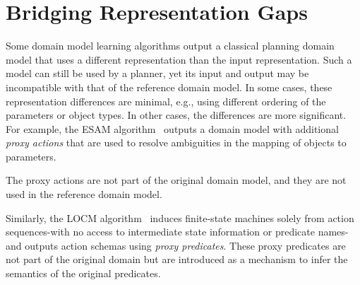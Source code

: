 \documentclass{article}
\theoremstyle{definition}
\theoremstyle{remark}
\newif\ifaddcomments
\newcommand{\roni}[1]{\ifaddcomments{\textcolor{red}{[Roni: #1]}}\fi}
\newcommand{\mauro}[1]{\ifaddcomments{\textcolor{green}{[Mauro: #1]}}\fi}
\newcommand{\yarin}[1]{\ifaddcomments{\textcolor{teal}{[Yarin: #1]}}\fi}
\begin{document}





\section{Bridging Representation Gaps}
\label{sec:bridging-gap}
Some domain model learning algorithms output a classical planning domain model that uses a different representation than the input representation. Such a model can still be used by a planner, yet its input and output may be incompatible with that of the reference domain model. 
In some cases, these representation differences are minimal, e.g., using different ordering of the parameters or object types. 
In other cases, the differences are more significant. 
For example, the ESAM algorithm~\citep{juba2021safe} outputs a domain model with additional \emph{proxy actions} that are used to resolve ambiguities in the mapping of objects to parameters.
\roni{Pascal mentioned a paper that learned macro actions. TODO: add ref for it here (with relevant short text)}
The proxy actions are not part of the original domain model, and they are not used in the reference domain model. 
\roni{More examples?}

\mauro{OpMaker2 generates classical planning models in OCL language \cite{mccluskey2010action}}

\yarin{added LOCM:}
Similarly, the LOCM algorithm~\citep{cresswell2013acquiring} induces finite-state machines solely from action sequences-with no access to intermediate state information or predicate names-and outputs action schemas using \emph{proxy predicates}. 
These proxy predicates are not part of the original domain but are introduced as a mechanism to infer the semantics of the original predicates. 
\end{document}
